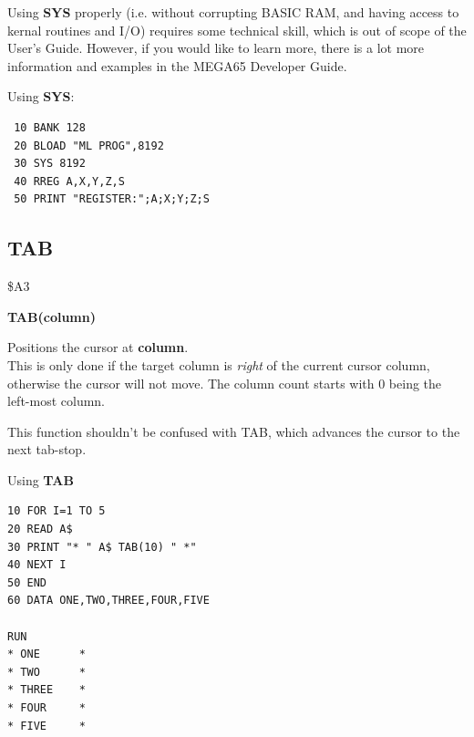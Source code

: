 \begin{description}[leftmargin=2cm,style=nextline]
                 Using {\bf SYS} properly (i.e. without corrupting BASIC RAM, and having
                 access to kernal routines and I/O) requires
                 some technical skill, which is out of scope of the User's Guide.
                 However, if you would like to learn more, there is a lot more
                 information and examples in the MEGA65 Developer Guide.

\item [Example:] Using {\bf SYS}:
\begin{tcolorbox}[colback=black,coltext=white]
\verbatimfont{\codefont}
\begin{verbatim}
 10 BANK 128
 20 BLOAD "ML PROG",8192
 30 SYS 8192
 40 RREG A,X,Y,Z,S
 50 PRINT "REGISTER:";A;X;Y;Z;S
\end{verbatim}
\end{tcolorbox}

\end{description}


\newpage
\subsection{TAB}
\begin{description}[leftmargin=2cm,style=nextline]
\item [Token:] \$A3
\item [Format:] {\bf TAB(column)}
\item [Usage:] Positions the cursor at {\bf column}. \\
               This is only done if the target column is {\it right}
               of the current cursor column, otherwise the cursor
               will not move. The column count starts with 0 being the
               left-most column.

\item [Remarks:] This function shouldn't be confused with
               {\specialkey TAB}, which advances the cursor to the next
               tab-stop.

\item [Example:] Using {\bf TAB}
\begin{tcolorbox}[colback=black,coltext=white]
\verbatimfont{\codefont}
\begin{verbatim}
10 FOR I=1 TO 5
20 READ A$
30 PRINT "* " A$ TAB(10) " *"
40 NEXT I
50 END
60 DATA ONE,TWO,THREE,FOUR,FIVE

RUN
* ONE      *
* TWO      *
* THREE    *
* FOUR     *
* FIVE     *
\end{verbatim}
\end{tcolorbox}
\end{description}

